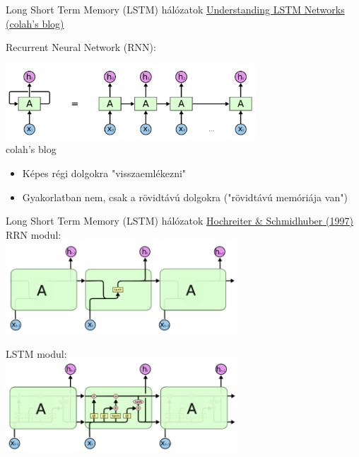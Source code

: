 \begin{frame}{Long Short Term Memory (LSTM) hálózatok}
    \href{https://colah.github.io/posts/2015-08-Understanding-LSTMs/}{Understanding LSTM Networks (colah's blog)}
    
    Recurrent Neural Network (RNN):
    
    \centering
    \includegraphics[width=0.7\textwidth]{figures/rnn.png} \\ \footnotesize{colah's blog}
    
    \normalsize
    \begin{itemize}
        \item Képes régi dolgokra "visszaemlékezni"
        \item Gyakorlatban nem, csak a rövidtávú dolgokra ("rövidtávú memóriája van")
    \end{itemize}
\end{frame}

\begin{frame}{Long Short Term Memory (LSTM) hálózatok}
    \href{http://www.bioinf.jku.at/publications/older/2604.pdf}{Hochreiter \& Schmidhuber (1997)} \\
    
    RRN modul:\\
    \centering
    \includegraphics[width=0.65\textwidth]{figures/lstm_only_rnn.png}
    
    \raggedright LSTM modul: \\
    \centering
    \includegraphics[width=0.65\textwidth]{figures/lstm_module.png}
\end{frame}

